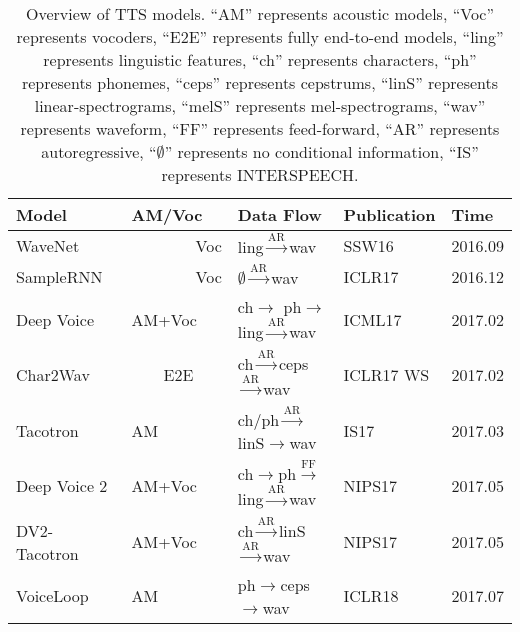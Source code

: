 \documentclass{article}
\begin{document}
\begin{center}
\small
\begin{longtable}{l | l | l | l | l }
	\caption{Overview of TTS models. ``AM'' represents acoustic models, ``Voc'' represents vocoders, ``E2E'' represents fully end-to-end models, ``ling'' represents linguistic features, ``ch'' represents characters, ``ph'' represents phonemes, ``ceps'' represents cepstrums, ``linS'' represents linear-spectrograms, ``melS'' represents mel-spectrograms, ``wav'' represents waveform, ``FF'' represents feed-forward, ``AR'' represents autoregressive, ``$\emptyset$'' represents no conditional information, ``IS'' represents INTERSPEECH.} 
	\label{tab_all_paper_list} \\
		\toprule
		Model & AM/Voc & Data Flow & Publication  & Time  \\
		\midrule
		WaveNet~\cite{oord2016wavenet} & ~~~~~~~~Voc & {\color{green}ling}$\stackrel{\text{AR}}{\longrightarrow}$wav  & SSW16 &   2016.09 \\
		SampleRNN~\cite{mehri2016samplernn} & ~~~~~~~~Voc & $\emptyset\stackrel{\text{AR}}{\longrightarrow}$wav  & ICLR17 &  2016.12 \\
		Deep Voice~\cite{arik2017deep} & AM+Voc & {\color{blue}ch}$\rightarrow$ {\color{blue}ph}$\rightarrow${\color{green}ling}$\stackrel{\text{AR}}{\longrightarrow}$wav           & ICML17&  2017.02 \\
		Char2Wav~\cite{sotelo2017char2wav} & ~~~~E2E & {\color{blue}ch}$\stackrel{\text{AR}}{\longrightarrow}${\color{red}ceps}$\stackrel{\text{AR}}{\longrightarrow}$wav           & ICLR17 WS  & 2017.02        \\
		Tacotron~\cite{wang2017tacotron} & AM &  {\color{blue}ch/ph}$\stackrel{\text{AR}}{\longrightarrow}${\color{red}linS}$\stackrel{}{\longrightarrow}$wav             & IS17 & 2017.03        \\
		Deep Voice 2~\cite{gibiansky2017deep}           & AM+Voc       &  {\color{blue}ch}$\rightarrow${\color{blue}ph}$\stackrel{\text{FF}}{\longrightarrow}${\color{green}ling}$\stackrel{\text{AR}}{\longrightarrow}$wav   & NIPS17& 2017.05        \\
		DV2-Tacotron~\cite{gibiansky2017deep}           & AM+Voc       &  {\color{blue}ch}$\stackrel{\text{AR}}{\longrightarrow}${\color{red}linS}$\stackrel{\text{AR}}{\longrightarrow}$wav    & NIPS17 & 2017.05        \\
		VoiceLoop~\cite{taigman2018voiceloop}             & AM & {\color{blue}ph}$\rightarrow${\color{red}ceps}$\stackrel{}{\longrightarrow}$wav              & ICLR18 &  2017.07         \\

\end{longtable}
\end{center}
\end{document}
